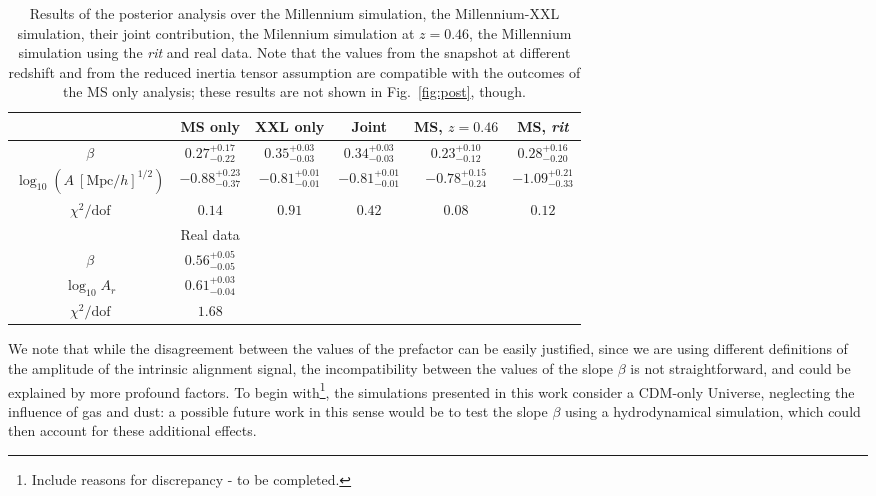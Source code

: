 \documentclass[a4paper,fleqn,usenatbib]{mnras}
\begin{document}
\begin{table*}
	\centering
	\caption{Results of the posterior analysis over the Millennium simulation, the Millennium-XXL simulation, their joint contribution, the Milennium simulation at $z = 0.46$, the Millennium simulation using the \textit{rit} and real data. Note that the values from the snapshot at different redshift and from the reduced inertia tensor assumption are compatible with the outcomes of the MS only analysis; these results are not shown in Fig.~\ref{fig:post}\protect{}, though.}
	\label{tab:param}
	\begin{tabular}{c||ccccc} %
		\hline \hline
		\ & MS only & XXL only & Joint & MS, $z=0.46$ & MS, \textit{rit} \\
		\hline
		$\beta$					  & $0.27^{+0.17}_{-0.22}$   & $0.35^{+0.03}_{-0.03}$  & $0.34^{+0.03}_{-0.03}$ &  $0.23^{+0.10}_{-0.12}$ & $0.28^{+0.16}_{-0.20}$ \\
		$\log_{10} (A \ [\mbox{Mpc}/h]^{1/2})$ & $-0.88^{+0.23}_{-0.37}$ & $-0.81^{+0.01}_{-0.01}$ & $-0.81^{+0.01}_{-0.01}$&$-0.78^{+0.15}_{-0.24}$&  $-1.09^{+0.21}_{-0.33}$\\
		$\chi^2 / \mbox{dof}$			  & $0.14$                                 & $0.91$			 & $0.42$			    & $0.08$			      & $0.12$	 \\
		\hline \hline
		\ & Real data & \ & \ \\
		\hline
		$\beta$ & $0.56^{+0.05}_{-0.05}$ & &\\
		$\log_{10} A_r $ & $0.61^{+0.03}_{-0.04}$ & & & & \\
		$\chi^2 / \mbox{dof}$			  & $1.68$  & & & & \\
		\hline \hline 
		\end{tabular}
\end{table*}

We note that while the disagreement between the values of the prefactor can be easily justified, since we are using different definitions of the amplitude of the intrinsic alignment signal, the incompatibility between the values of the slope $\beta$ is not straightforward, and could be explained by more profound factors.
To begin with\footnote{Include reasons for discrepancy - to be completed.}, the simulations presented in this work consider a CDM-only Universe, neglecting the influence of gas and dust: a possible future work in this sense would be to test the slope $\beta$ using a hydrodynamical simulation, which could then account for these additional effects.
\end{document}
